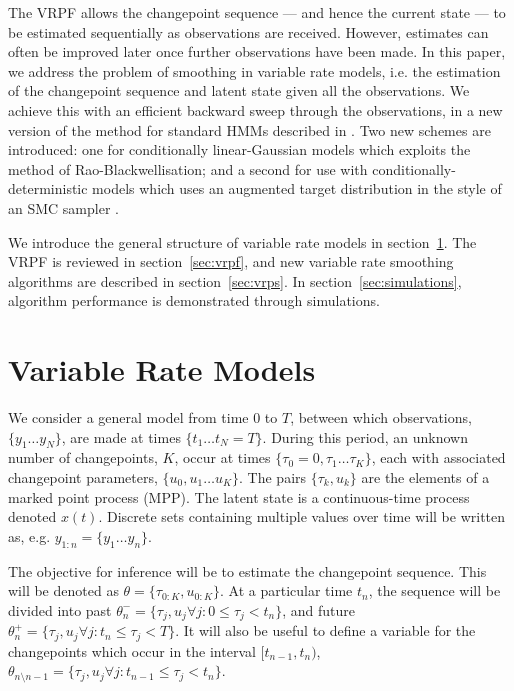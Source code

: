 \documentclass[peerreview,11pt,draftcls,onecolumn]{IEEEtran}
\begin{document}
The VRPF allows the changepoint sequence --- and hence the current state --- to be estimated sequentially as observations are received. However, estimates can often be improved later once further observations have been made. In this paper, we address the problem of smoothing in variable rate models, i.e. the estimation of the changepoint sequence and latent state given all the observations. We achieve this with an efficient backward sweep through the observations, in a new version of the method for standard HMMs described in \cite{Godsill2004}. Two new schemes are introduced: one for conditionally linear-Gaussian models which exploits the method of Rao-Blackwellisation; and a second for use with conditionally-deterministic models which uses an augmented target distribution in the style of an SMC sampler \cite{DelMoral2006}.

We introduce the general structure of variable rate models in section~\ref{sec:vr_models}. The VRPF is reviewed in section~\ref{sec:vrpf}, and new variable rate smoothing algorithms are described in section~\ref{sec:vrps}. In section~\ref{sec:simulations}, algorithm performance is demonstrated through simulations.



\section{Variable Rate Models} \label{sec:vr_models}

We consider a general model from time $0$ to $T$, between which observations, $\{y_1 \dots y_N\}$, are made at times $\{t_1 \dots t_N = T\}$. During this period, an unknown number of changepoints, $K$, occur at times $\{\tau_0 = 0, \tau_1 \dots \tau_K \}$, each with associated changepoint parameters, $\{ u_0, u_1 \dots u_K \}$. The pairs $\{\tau_k, u_k\}$ are the elements of a marked point process (MPP). The latent state is a continuous-time process denoted $x(t)$. Discrete sets containing multiple values over time will be written as, e.g. $y_{1:n} = \{y_1 \dots y_n\}$.

The objective for inference will be to estimate the changepoint sequence. This will be denoted as $\theta = \{\tau_{0:K}, u_{0:K}\}$. At a particular time $t_n$, the sequence will be divided into past $\theta_n^- = \{\tau_{j}, u_{j} \forall j : 0 \leq \tau_j < t_n \}$, and future $\theta_n^+ = \{\tau_{j}, u_{j} \forall j : t_n \leq \tau_j < T \}$. It will also be useful to define a variable for the changepoints which occur in the interval $[t_{n-1},t_n)$, $\theta_{n \setminus n-1} = \{\tau_{j}, u_{j} \forall j : t_{n-1} \leq \tau_j < t_n \}$.
\end{document}
